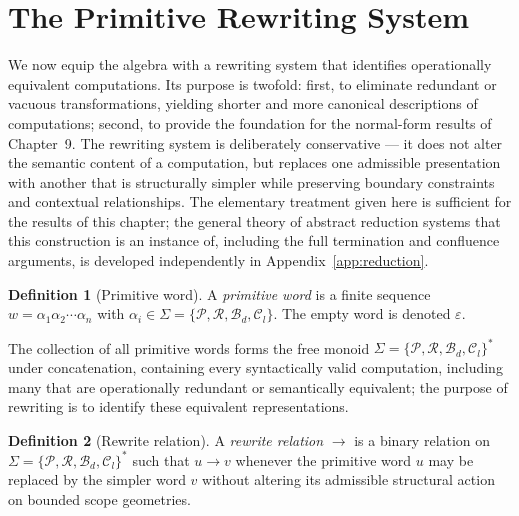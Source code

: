 \documentclass[11pt,twoside,openright]{book}
\numberwithin{equation}{chapter}
\theoremstyle{definition}
\newtheorem{definition}{Definition}[chapter]
\theoremstyle{plain}
\theoremstyle{remark}
\theoremstyle{definition}
\newcommand{\Alphabet}{\Sigma}
\newcommand{\Pop}{\mathcal{P}}
\newcommand{\Refuse}{\mathcal{R}}
\newcommand{\Bind}{\mathcal{B}_d}
\newcommand{\Collapse}{\mathcal{C}_l}
\newcommand{\ScopeAlphabet}{\Alphabet=\{\Pop,\Refuse,\Bind,\Collapse\}}
\begin{document}
\section{The Primitive Rewriting System}

We now equip the algebra with a rewriting system that identifies
operationally equivalent computations. Its purpose is twofold: first, to
eliminate redundant or vacuous transformations, yielding shorter and more
canonical descriptions of computations; second, to provide the foundation
for the normal-form results of Chapter~9. The rewriting system is
deliberately conservative --- it does not alter the semantic content of a
computation, but replaces one admissible presentation with another that
is structurally simpler while preserving boundary constraints and
contextual relationships. The elementary treatment given here is
sufficient for the results of this chapter; the general theory of
abstract reduction systems that this construction is an instance of,
including the full termination and confluence arguments, is developed
independently in Appendix~\ref{app:reduction}.

\begin{definition}[Primitive word]
A \emph{primitive word} is a finite sequence
$w=\alpha_1\alpha_2\cdots\alpha_n$ with $\alpha_i\in\ScopeAlphabet$. The
empty word is denoted $\varepsilon$.
\end{definition}

The collection of all primitive words forms the free monoid
$\ScopeAlphabet^{*}$ under concatenation, containing every syntactically
valid computation, including many that are operationally redundant or
semantically equivalent; the purpose of rewriting is to identify these
equivalent representations.

\begin{definition}[Rewrite relation]
A \emph{rewrite relation} $\longrightarrow$ is a binary relation on
$\ScopeAlphabet^{*}$ such that $u\longrightarrow v$ whenever the primitive
word $u$ may be replaced by the simpler word $v$ without altering its
admissible structural action on bounded scope geometries.
\end{definition}
\end{document}
